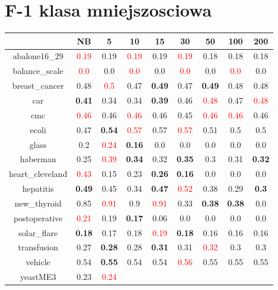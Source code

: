 \documentclass{article}%
\begin{document}
\section*{F{-}1 klasa mniejszosciowa}%
\begin{tabular}{c|cccccccc}%
\hline%
&NB&5&10&15&30&50&100&200\\%
\hline%
abalone16\_29&\textcolor{red}{ 
0.19
}&0.19&\textcolor{red}{ 
0.19
}&0.19&\textcolor{red}{ 
0.19
}&0.18&0.18&0.18\\%
\hline%
balance\_scale&\textcolor{red}{ 
0.0
}&0.0&\textcolor{red}{ 
0.0
}&0.0&\textcolor{red}{ 
0.0
}&0.0&\textcolor{red}{ 
0.0
}&0.0\\%
\hline%
breast\_cancer&0.48&\textcolor{red}{ 
0.5
}&0.47&\textbf{0.49}&0.47&\textbf{0.49}&0.48&0.48\\%
\hline%
car&\textbf{0.41}&0.34&0.34&\textbf{0.39}&0.46&\textcolor{red}{ 
0.48
}&0.47&\textcolor{red}{ 
0.48
}\\%
\hline%
cmc&\textcolor{red}{ 
0.46
}&0.46&\textcolor{red}{ 
0.46
}&0.46&0.45&\textcolor{red}{ 
0.46
}&\textcolor{red}{ 
0.46
}&0.46\\%
\hline%
ecoli&0.47&\textbf{0.54}&\textcolor{red}{ 
0.57
}&0.57&\textcolor{red}{ 
0.57
}&0.51&0.5&0.5\\%
\hline%
glass&0.2&\textcolor{red}{ 
0.24
}&\textbf{0.16}&0.0&0.0&0.0&0.0&0.0\\%
\hline%
haberman&0.25&\textcolor{red}{ 
0.39
}&\textbf{0.34}&0.32&\textbf{0.35}&0.3&0.31&\textbf{0.32}\\%
\hline%
heart\_cleveland&\textcolor{red}{ 
0.43
}&0.15&0.23&\textbf{0.26}&\textbf{0.16}&0.0&0.0&0.0\\%
\hline%
hepatitis&\textbf{0.49}&0.45&0.34&\textbf{0.47}&\textcolor{red}{ 
0.52
}&0.38&0.29&\textbf{0.3}\\%
\hline%
new\_thyroid&0.85&\textcolor{red}{ 
0.91
}&0.9&\textcolor{red}{ 
0.91
}&0.33&\textbf{0.38}&\textbf{0.38}&0.0\\%
\hline%
postoperative&\textcolor{red}{ 
0.21
}&0.19&\textbf{0.17}&0.06&0.0&0.0&0.0&0.0\\%
\hline%
solar\_flare&\textbf{0.18}&0.17&0.18&\textcolor{red}{ 
0.19
}&\textbf{0.18}&0.16&0.16&0.16\\%
\hline%
transfusion&0.27&\textbf{0.28}&0.28&\textbf{0.31}&0.31&\textcolor{red}{ 
0.32
}&0.3&0.3\\%
\hline%
vehicle&0.54&\textbf{0.55}&0.54&0.54&\textcolor{red}{ 
0.56
}&0.55&0.55&0.55\\%
\hline%
yeastME3&0.23&\textcolor{red}{ 
0.24
}
\end{tabular}
\end{document}
